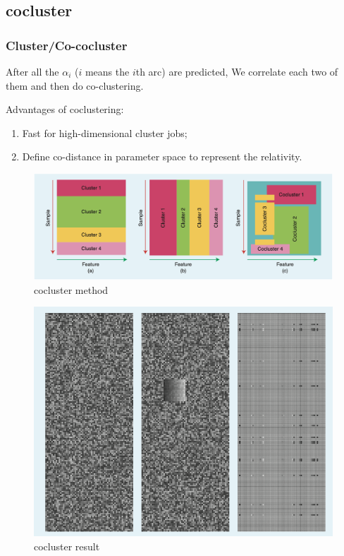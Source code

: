 \documentclass[aspectratio=169]{beamer}
\begin{document}
    \subsection{cocluster}
    \begin{frame}[allowframebreaks]
        \frametitle{Cluster/Co-cocluster}
    
        After all the $\alpha_i$ ($i$ means the $i$th arc) are predicted,
        We correlate each two of them and then do co-clustering.

        Advantages of coclustering:
        \begin{enumerate}
            \item Fast for high-dimensional cluster jobs;
            \item Define co-distance in parameter space to represent the relativity.
        \end{enumerate}
        \framebreak

        \begin{figure}
            \includegraphics[width=0.8\linewidth]{pic/cocluster.png}
            \caption{cocluster method}
        \end{figure}
        \begin{figure}
            \includegraphics[width=0.5\linewidth]{pic/cocluster2.png}
            \caption{cocluster result}
        \end{figure}

    
    \end{frame}
\end{document}
